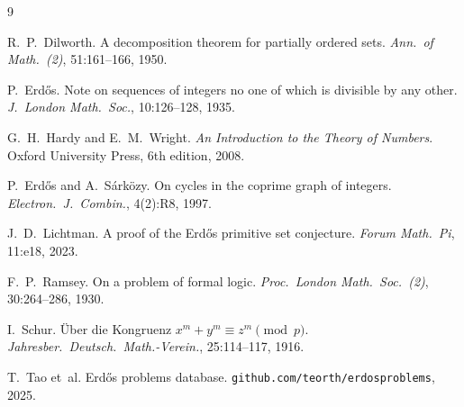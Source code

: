 \documentclass[11pt]{article}
\theoremstyle{plain}
\theoremstyle{definition}
\begin{document}
\begin{thebibliography}{9}

R.~P.~Dilworth.
A decomposition theorem for partially ordered sets.
\emph{Ann.\ of Math.\ (2)}, 51:161--166, 1950.

P.~Erd\H{o}s.
Note on sequences of integers no one of which is divisible by any other.
\emph{J.\ London Math.\ Soc.}, 10:126--128, 1935.

G.~H.~Hardy and E.~M.~Wright.
\emph{An Introduction to the Theory of Numbers}.
Oxford University Press, 6th edition, 2008.

P.~Erd\H{o}s and A.~S\'ark\"ozy.
On cycles in the coprime graph of integers.
\emph{Electron.\ J.\ Combin.}, 4(2):R8, 1997.

J.~D.~Lichtman.
A proof of the {E}rd\H{o}s primitive set conjecture.
\emph{Forum Math.\ Pi}, 11:e18, 2023.

F.~P.~Ramsey.
On a problem of formal logic.
\emph{Proc.\ London Math.\ Soc.\ (2)}, 30:264--286, 1930.

I.~Schur.
\"{U}ber die {K}ongruenz $x^m+y^m\equiv z^m\pmod{p}$.
\emph{Jahresber.\ Deutsch.\ Math.-Verein.}, 25:114--117, 1916.

T.~Tao et~al.
Erd\H{o}s problems database.
\texttt{github.com/teorth/erdosproblems}, 2025.

\end{thebibliography}
\end{document}
